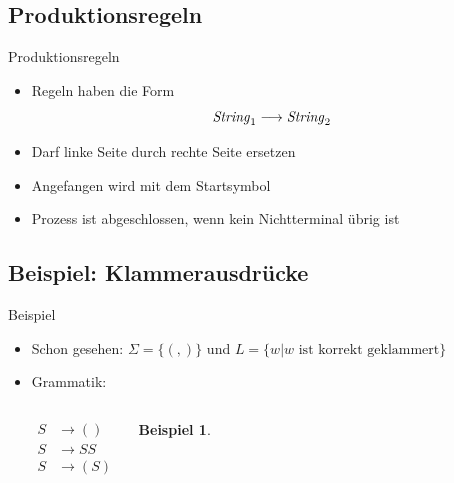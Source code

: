 \documentclass{beamer}
\theoremstyle{example}
\newtheorem{ex}{Beispiel}
\begin{document}
\subsection{Produktionsregeln}
\begin{frame}{Produktionsregeln}
  \begin{itemize}
  \item{} Regeln haben die Form
    \[\text{\textit{String}}_1 \longrightarrow \text{\textit{String}}_2\]
  \item{} Darf linke Seite durch rechte Seite ersetzen
  \item{} Angefangen wird mit dem Startsymbol
  \item{} Prozess ist abgeschlossen, wenn kein Nichtterminal übrig ist
  \end{itemize}
\end{frame}

\subsection{Beispiel: Klammerausdrücke}
\begin{frame}{Beispiel}
  \begin{itemize}
  \item Schon gesehen: $\Sigma = \{(,)\}$ und  $L = \{ w | \text{$w$ ist korrekt geklammert}\}$\pause
  \item Grammatik:
    \begin{columns}[l]
     \column{2cm}
    \begin{align*}
      S &\rightarrow ()\\
      S &\rightarrow SS\\
      S &\rightarrow (S)
    \end{align*}\pause
     \column{6cm}
     \begin{ex}
       \vspace*{5cm}
       \hspace*{6cm}
     \end{ex}
    \end{columns}
  \end{itemize}
\end{frame}
\end{document}
